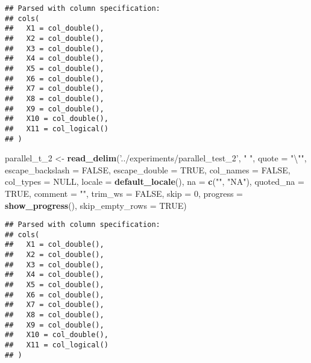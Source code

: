 \documentclass[]{article}
\newenvironment{Shaded}{\begin{snugshade}}{\end{snugshade}}
\newcommand{\KeywordTok}[1]{\textcolor[rgb]{0.13,0.29,0.53}{\textbf{#1}}}
\newcommand{\DataTypeTok}[1]{\textcolor[rgb]{0.13,0.29,0.53}{#1}}
\newcommand{\DecValTok}[1]{\textcolor[rgb]{0.00,0.00,0.81}{#1}}
\newcommand{\CharTok}[1]{\textcolor[rgb]{0.31,0.60,0.02}{#1}}
\newcommand{\StringTok}[1]{\textcolor[rgb]{0.31,0.60,0.02}{#1}}
\newcommand{\OtherTok}[1]{\textcolor[rgb]{0.56,0.35,0.01}{#1}}
\newcommand{\NormalTok}[1]{#1}
\begin{document}
\begin{verbatim}
## Parsed with column specification:
## cols(
##   X1 = col_double(),
##   X2 = col_double(),
##   X3 = col_double(),
##   X4 = col_double(),
##   X5 = col_double(),
##   X6 = col_double(),
##   X7 = col_double(),
##   X8 = col_double(),
##   X9 = col_double(),
##   X10 = col_double(),
##   X11 = col_logical()
## )
\end{verbatim}

\begin{Shaded}
\begin{Highlighting}[]
\NormalTok{parallel_t_}\DecValTok{2}\NormalTok{ <-}\StringTok{ }\KeywordTok{read_delim}\NormalTok{(}\StringTok{'../experiments/parallel_test_2'}\NormalTok{, }\StringTok{" "}\NormalTok{, }\DataTypeTok{quote =} \StringTok{"}\CharTok{\textbackslash{}"}\StringTok{"}\NormalTok{, }\DataTypeTok{escape_backslash =} \OtherTok{FALSE}\NormalTok{,}
  \DataTypeTok{escape_double =} \OtherTok{TRUE}\NormalTok{, }\DataTypeTok{col_names =} \OtherTok{FALSE}\NormalTok{, }\DataTypeTok{col_types =} \OtherTok{NULL}\NormalTok{,}
  \DataTypeTok{locale =} \KeywordTok{default_locale}\NormalTok{(), }\DataTypeTok{na =} \KeywordTok{c}\NormalTok{(}\StringTok{""}\NormalTok{, }\StringTok{"NA"}\NormalTok{), }\DataTypeTok{quoted_na =} \OtherTok{TRUE}\NormalTok{,}
  \DataTypeTok{comment =} \StringTok{""}\NormalTok{, }\DataTypeTok{trim_ws =} \OtherTok{FALSE}\NormalTok{, }\DataTypeTok{skip =} \DecValTok{0}\NormalTok{, }
 \DataTypeTok{progress =} \KeywordTok{show_progress}\NormalTok{(),}
  \DataTypeTok{skip_empty_rows =} \OtherTok{TRUE}\NormalTok{)}
\end{Highlighting}
\end{Shaded}

\begin{verbatim}
## Parsed with column specification:
## cols(
##   X1 = col_double(),
##   X2 = col_double(),
##   X3 = col_double(),
##   X4 = col_double(),
##   X5 = col_double(),
##   X6 = col_double(),
##   X7 = col_double(),
##   X8 = col_double(),
##   X9 = col_double(),
##   X10 = col_double(),
##   X11 = col_logical()
## )
\end{verbatim}
\end{document}
